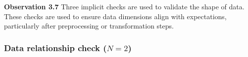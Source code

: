 \documentclass[smallextended]{svjour3}       %
\newcommand{\highlight}[1]{\begin{framed}%
  \noindent#1
\end{framed}}
\providecommand{\DIFaddbegin}{} %
\providecommand{\DIFaddend}{} %
\providecommand{\DIFdelbegin}{} %
\providecommand{\DIFdelend}{} %
\newcommand{\DIFscaledelfig}{0.5}
\newlength{\DIFdelgraphicswidth} %
\newlength{\DIFdelgraphicsheight} %
\newcommand{\DIFaddincludegraphics}[2][]{{\color{blue}\fbox{\DIFOincludegraphics[#1]{#2}}}} %
\newcommand{\DIFdelincludegraphics}[2][]{%
\sbox{\DIFdelgraphicsbox}{\DIFOincludegraphics[#1]{#2}}%
\settoboxwidth{\DIFdelgraphicswidth}{\DIFdelgraphicsbox} %
\settoboxtotalheight{\DIFdelgraphicsheight}{\DIFdelgraphicsbox} %
\scalebox{\DIFscaledelfig}{%
\parbox[b]{\DIFdelgraphicswidth}{\usebox{\DIFdelgraphicsbox}\\[-\baselineskip] \rule{\DIFdelgraphicswidth}{0em}}\llap{\resizebox{\DIFdelgraphicswidth}{\DIFdelgraphicsheight}{%
\setlength{\unitlength}{\DIFdelgraphicswidth}%
\begin{picture}(1,1)%
\thicklines\linethickness{2pt} %
{\color[rgb]{1,0,0}\put(0,0){\framebox(1,1){}}}%
{\color[rgb]{1,0,0}\put(0,0){\line( 1,1){1}}}%
{\color[rgb]{1,0,0}\put(0,1){\line(1,-1){1}}}%
\end{picture}%
}\hspace*{3pt}}} %
} %
\DeclareRobustCommand{\DIFaddbegin}{\DIFOaddbegin \let\includegraphics\DIFaddincludegraphics} %
\DeclareRobustCommand{\DIFaddend}{\DIFOaddend \let\includegraphics\DIFOincludegraphics} %
\DeclareRobustCommand{\DIFdelbegin}{\DIFOdelbegin \let\includegraphics\DIFdelincludegraphics} %
\DeclareRobustCommand{\DIFdelend}{\DIFOaddend \let\includegraphics\DIFOincludegraphics} %
\begin{document}
\DIFdelbegin %
\DIFdelend \DIFaddbegin \highlight{\textbf{Observation 3.7} Three implicit checks are used to validate the shape of data. These checks are used to ensure data dimensions align with expectations, particularly after preprocessing or transformation steps.}
\DIFaddend 

\subsubsection{Data relationship check ($N = 2$)}~\label{sec:linear-relation-output}
\end{document}
